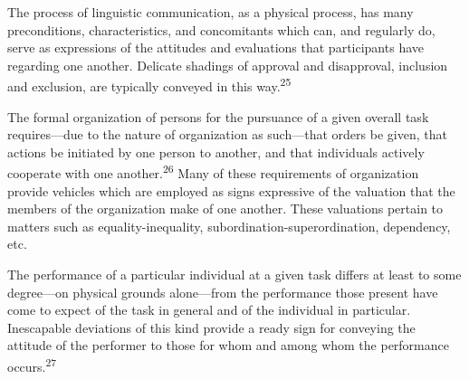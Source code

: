\documentclass[twoside,symmetric,nobib,justified]{tufte-book}
\begin{document}
The process of linguistic communication, as a physical process, has many
preconditions, characteristics, and concomitants which can, and
regularly do, serve as expressions of the attitudes and evaluations that
participants have regarding one another. Delicate shadings of approval
and disapproval, inclusion and exclusion, are typically conveyed in this
way.\textsuperscript{25}

The formal organization of persons for the pursuance of a given overall
task requires---due to the nature of organization as such---that orders
be given, that actions be initiated by one person to another, and that
individuals actively cooperate with one another.\textsuperscript{26} Many of these
requirements of organization provide vehicles which are employed as
signs expressive of the valuation that the members of the organization
make of one another. These valuations pertain to matters such as
equality-inequality, subordination-superordination, dependency, etc.

The performance of a particular individual at a given task differs at
least to some degree---on physical grounds alone---from the performance
those present have come to expect of the task in general and of the
individual in particular. Inescapable deviations of this kind provide a
ready sign for conveying the attitude of the performer to those for whom
and among whom the performance occurs.\textsuperscript{27}
\end{document}
